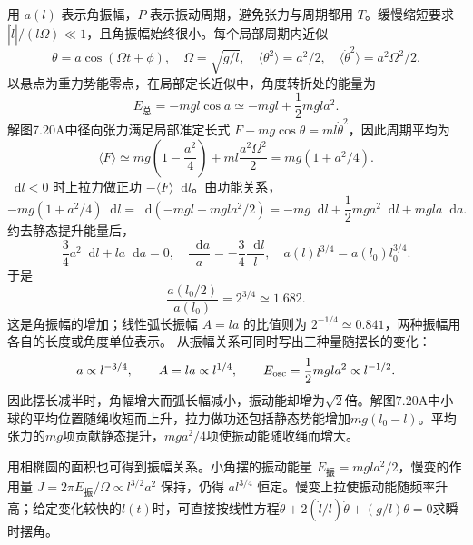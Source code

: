 \documentclass[UTF8,fontset=fandol,a4paper,11pt]{ctexart}
\newcommand{\dd}{\mathop{}\!\mathrm{d}}
\newcommand{\figcaption}[1]{\par\vspace{2pt}{\small\color{muted}#1}\par}
\begin{document}
\begin{center}\begin{minipage}{\linewidth}\centering{}\figcaption{解图 7.20A\quad $\theta$为瞬时摆角，$a$表示角振幅。}\end{minipage}\end{center}
用 $a(l)$ 表示角振幅，$P$ 表示振动周期，避免张力与周期都用 $T$。缓慢缩短要求 $|\dot l|/(l\Omega)\ll1$，且角振幅始终很小。每个局部周期内近似
\[\theta=a\cos(\Omega t+\phi),\quad\Omega=\sqrt{g/l},\quad
\langle\theta^2\rangle=a^2/2,\quad
\langle\dot\theta^2\rangle=a^2\Omega^2/2.\]
以悬点为重力势能零点，在局部定长近似中，角度转折处的能量为
\[E_{
\text{总}}=-mgl\cos a\simeq-mgl+\frac12mgla^2.\]
解图7.20A中径向张力满足局部准定长式 $F-mg\cos\theta=ml\dot\theta^2$，因此周期平均为
\[\langle F\rangle\simeq mg\left(1-\frac{a^2}{4}\right)
+ml\frac{a^2\Omega^2}{2}=mg(1+a^2/4).\]
$\dd l<0$ 时上拉力做正功 $-\langle F\rangle\dd l$。由功能关系，
\[-mg(1+a^2/4)\dd l
=\dd(-mgl+mgla^2/2)
=-mg\dd l+\frac12mga^2\dd l+mgla\dd a.\]
约去静态提升能量后，
\[\frac34a^2\dd l+la\dd a=0,
\quad\frac{\dd a}{a}=-\frac34\frac{\dd l}{l},
\quad a(l)l^{3/4}=a(l_0)l_0^{3/4}.\]
于是
\[\boxed{\frac{a(l_0/2)}{a(l_0)}=2^{3/4}\simeq1.682.}\]
这是角振幅的增加；线性弧长振幅 $A=la$ 的比值则为 $2^{-1/4}\simeq0.841$，两种振幅用各自的长度或角度单位表示。
从振幅关系可同时写出三种量随摆长的变化：
\[a\propto l^{-3/4},\qquad A=la\propto l^{1/4},
\qquad E_{\rm osc}=\frac12mgla^2\propto l^{-1/2}.\]
因此摆长减半时，角幅增大而弧长幅减小，振动能却增为$\sqrt2$倍。解图7.20A中小球的平均位置随绳收短而上升，拉力做功还包括静态势能增加$mg(l_0-l)$。平均张力的$mg$项贡献静态提升，$mga^2/4$项使振动能随收绳而增大。

用相椭圆的面积也可得到振幅关系。小角摆的振动能量 $E_{
\text{振}}=mgla^2/2$，慢变的作用量 $J=2\pi E_{
\text{振}}/\Omega\propto l^{3/2}a^2$ 保持，仍得 $al^{3/4}$ 恒定。慢变上拉使振动能随频率升高；给定变化较快的$l(t)$时，可直接按线性方程$\ddot\theta+2(\dot l/l)\dot\theta+(g/l)\theta=0$求瞬时摆角。
\end{document}
